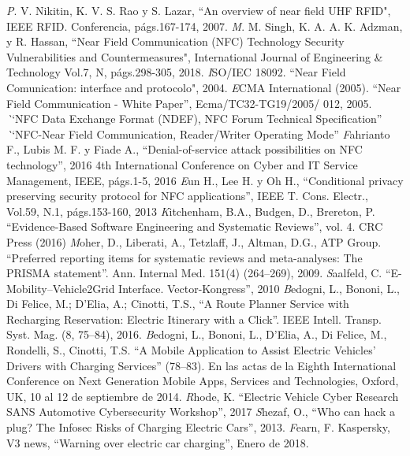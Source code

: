 \documentclass[12pt,a4paper,onecolumn,oneside]{report}
\begin{document}
\begin{thebibliography}{1}
 \textit P. V. Nikitin, K. V. S. Rao y S. Lazar, ``An overview of near field UHF RFID", IEEE RFID. Conferencia, p\'ags.167-174, 2007.
 \textit M. M. Singh, K. A. A. K. Adzman, y R. Hassan, ``Near Field Communication (NFC) Technology Security Vulnerabilities and Countermeasures", International Journal of Engineering \& Technology Vol.7, N, p\'ags.298-305, 2018.
 \textit ISO/IEC 18092. ``Near Field Comunication: interface and protocolo", 2004.
 \textit ECMA International (2005). ``Near Field Communication - White Paper”, Ecma/TC32-TG19/2005/ 012, 2005.
 \textit ``NFC Data Exchange Format (NDEF), NFC Forum Technical Specification”
 \textit ``NFC-Near Field Communication, Reader/Writer Operating Mode”
 \textit Fahrianto F., Lubis M. F. y Fiade A., ``Denial-of-service attack possibilities on NFC technology”, 2016 4th International Conference on Cyber and IT Service Management, IEEE, págs.1-5, 2016
 \textit Eun H., Lee H. y Oh H., ``Conditional privacy preserving security protocol for NFC applications”, IEEE T. Cons. Electr., Vol.59, N\textdegree.1, págs.153-160, 2013
 \textit Kitchenham, B.A., Budgen, D., Brereton, P. ``Evidence-Based Software Engineering and Systematic Reviews”, vol. 4. CRC Press (2016)
 \textit Moher, D., Liberati, A., Tetzlaff, J., Altman, D.G., ATP Group. ``Preferred reporting
items for systematic reviews and meta-analyses: The PRISMA statement”. Ann. Internal Med. 151(4) (264–269), 2009.
 \textit Saalfeld, C. ``E-Mobility–Vehicle2Grid Interface. Vector-Kongress”, 2010
 \textit Bedogni, L., Bononi, L., Di Felice, M.; D’Elia, A.; Cinotti, T.S., ``A Route Planner Service with Recharging
Reservation: Electric Itinerary with a Click”. IEEE Intell. Transp. Syst. Mag. (8, 75–84), 2016.
 \textit Bedogni, L., Bononi, L., D’Elia, A., Di Felice, M., Rondelli, S., Cinotti, T.S. ``A Mobile Application to Assist
Electric Vehicles’ Drivers with Charging Services” (78–83). En las actas de la Eighth International Conference on Next Generation Mobile Apps, Services and Technologies, Oxford, UK, 10 al 12 de septiembre de 2014.
 \textit Rhode, K. ``Electric Vehicle Cyber Research SANS Automotive Cybersecurity Workshop”, 2017
 \textit Shezaf, O., ``Who can hack a plug? The Infosec Risks of Charging Electric Cars”, 2013.
 \textit Fearn, F. Kaspersky, V3 news, ``Warning over electric car charging”, Enero de 2018.

\end{thebibliography}
\end{document}
